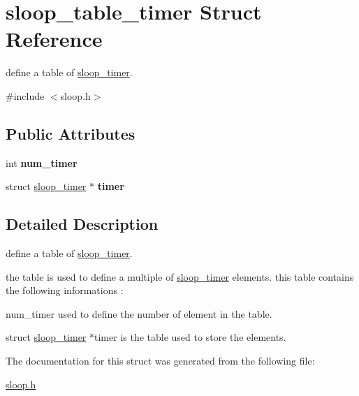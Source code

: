 \hypertarget{structsloop__table__timer}{\section{sloop\-\_\-table\-\_\-timer \-Struct \-Reference}
\label{structsloop__table__timer}
}


define a table of \hyperlink{structsloop__timer}{sloop\-\_\-timer}.  




{\ttfamily \#include $<$sloop.\-h$>$}

\subsection*{\-Public \-Attributes}
\begin{DoxyCompactItemize}
\item 
\hypertarget{structsloop__table__timer_afa25e6a9083664a117b6baf76657d7e6}{int {\bfseries num\-\_\-timer}}\label{structsloop__table__timer_afa25e6a9083664a117b6baf76657d7e6}

\item 
\hypertarget{structsloop__table__timer_aa13e3069359778d35a9e02b25c47e49b}{struct \hyperlink{structsloop__timer}{sloop\-\_\-timer} $\ast$ {\bfseries timer}}\label{structsloop__table__timer_aa13e3069359778d35a9e02b25c47e49b}

\end{DoxyCompactItemize}


\subsection{\-Detailed \-Description}
define a table of \hyperlink{structsloop__timer}{sloop\-\_\-timer}. 

the table is used to define a multiple of \hyperlink{structsloop__timer}{sloop\-\_\-timer} elements. this table contains the following informations \-:
\begin{DoxyItemize}
\item num\-\_\-timer used to define the number of element in the table.
\item struct \hyperlink{structsloop__timer}{sloop\-\_\-timer} $\ast$timer is the table used to store the elements. 
\end{DoxyItemize}

\-The documentation for this struct was generated from the following file\-:\begin{DoxyCompactItemize}
\item 
\hyperlink{sloop_8h}{sloop.\-h}\end{DoxyCompactItemize}
